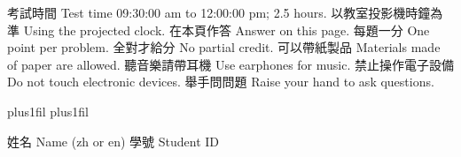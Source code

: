 \documentclass[a4paper]{article}
\begin{document}
\sffamily

考試時間 Test time 09:30:00 am to 12:00:00 pm; 2.5 hours.
以教室投影機時鐘為準 Using the projected clock.
在本頁作答 Answer on this page.
每題一分 One point per problem.
全對才給分 No partial credit.
可以帶紙製品 Materials made of paper are allowed.
聽音樂請帶耳機 Use earphones for music.
禁止操作電子設備 Do not touch electronic devices.
舉手問問題 Raise your hand to ask questions.

\advance{} plus1fil
\advance\baselineskip1cm plus1fil

姓名 Name (zh or en) \hfil 學號 Student ID

\answersheet




\end{document}
